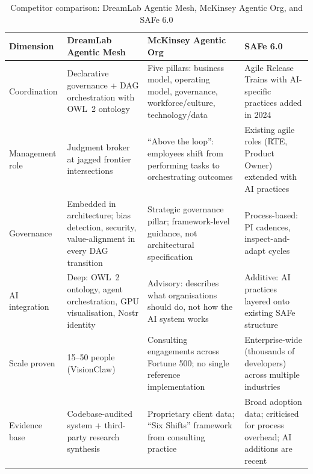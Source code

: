 \begin{table}[H]
\centering
\caption{Competitor comparison: DreamLab Agentic Mesh, McKinsey Agentic Org, and SAFe 6.0}
\label{tab:competitor-matrix-1}
\footnotesize
\begin{tabularx}{\textwidth}{L{2cm} X X X}
\toprule
\textbf{Dimension} & \textbf{DreamLab Agentic Mesh} & \textbf{McKinsey Agentic Org} & \textbf{SAFe 6.0} \\
\midrule
Coordination & Declarative governance + DAG orchestration with OWL~2 ontology & Five pillars: business model, operating model, governance, workforce/culture, technology/data & Agile Release Trains with AI-specific practices added in 2024 \\
\addlinespace
Management role & Judgment broker at jagged frontier intersections & ``Above the loop'': employees shift from performing tasks to orchestrating outcomes & Existing agile roles (RTE, Product Owner) extended with AI practices \\
\addlinespace
Governance & Embedded in architecture; bias detection, security, value-alignment in every DAG transition & Strategic governance pillar; framework-level guidance, not architectural specification & Process-based: PI cadences, inspect-and-adapt cycles \\
\addlinespace
AI integration & Deep: OWL~2 ontology, agent orchestration, GPU visualisation, Nostr identity & Advisory: describes what organisations should do, not how the AI system works & Additive: AI practices layered onto existing SAFe structure \\
\addlinespace
Scale proven & 15--50 people (VisionClaw) & Consulting engagements across Fortune 500; no single reference implementation & Enterprise-wide (thousands of developers) across multiple industries \\
\addlinespace
Evidence base & Codebase-audited system + third-party research synthesis & Proprietary client data; ``Six Shifts'' framework from consulting practice & Broad adoption data; criticised for process overhead; AI additions are recent \\
\bottomrule
\end{tabularx}
\end{table}

